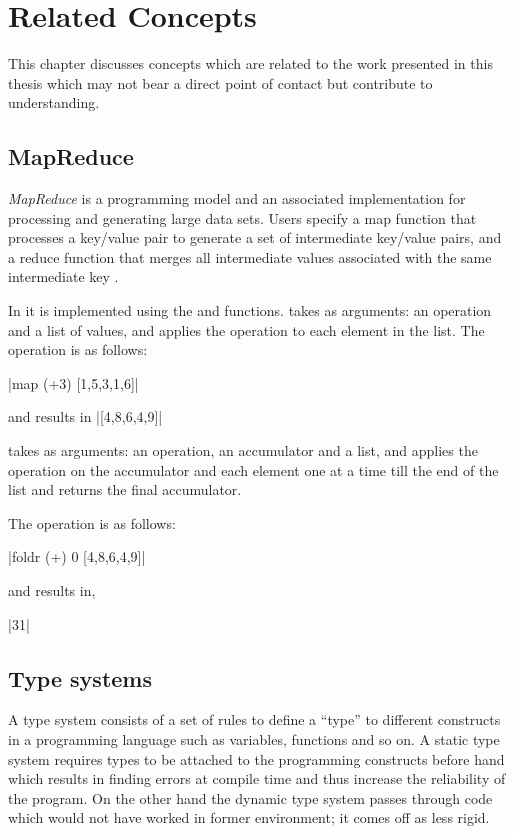 \documentclass[proposal.tex]{subfiles}
\begin{document}
\chapter{Related Concepts}\label{chap:relatedWork}

This chapter discusses concepts which are related to the work presented in this thesis which may not bear a direct
point of contact but contribute to understanding.

\section{MapReduce}

\textit{MapReduce} is a programming model and an associated implementation for processing and generating large data
sets.
Users specify a map function that processes a key/value pair to generate a set of intermediate key/value pairs, and
a reduce function that merges all intermediate values associated with the same intermediate key
\cite{dean2008mapreduce}.

In  it is implemented using the  and  functions.
 takes as arguments: an operation and a list of values, and applies the operation to each
element in the list.
The  operation is as follows:

|map (+3) [1,5,3,1,6]|

\noindent and results in
|[4,8,6,4,9]|

\noindent {} takes as arguments: an operation, an accumulator and a list, and applies the operation on the
accumulator and each element one at a time till the end of the list and returns the final accumulator.

The  operation is as follows:

|foldr (+) 0 [4,8,6,4,9]|

\noindent and results in,

|31|
 

\section{Type systems}

A type system consists of a set of rules to define a ``type'' to different constructs in a
programming language such as variables, functions and so on.
A static type system requires types to be attached to the programming constructs before hand which results in
finding errors at compile time and thus increase the reliability of the program.
On the other hand the dynamic type system passes through code which would not have worked in former
environment; it comes off as less rigid.
\end{document}
